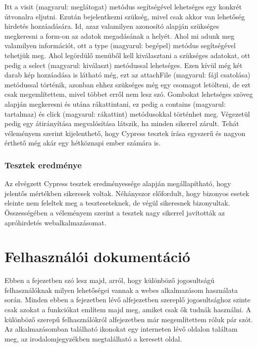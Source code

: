 \documentclass[]{thesis-ekf}
\theoremstyle{definition}
\theoremstyle{remark}
\begin{document}
		
		
		Itt a visit (magyarul: meglátogat) metódus segítségével lehetséges egy konkrét útvonalra eljutni. Ezután bejelentkezni szükség, mivel csak akkor van lehetőség hirdetés hozzáadására. Id, azaz valamilyen azonosító alapján szükséges megkeresni a form-on az adatok megadásának a helyét. Ahol mi adunk meg valamilyen információt, ott a type (magyarul: begépel) metódus segítségével tehetjük meg. Ahol legördülő menüből kell kiválasztani a szükséges adatokat, ott pedig a select (magyarul: kiválaszt) metódussal lehetséges. Ezen kívül még két darab kép hozzáadása is látható még, ezt az attachFile (magyarul: fájl csatolása) metódussal történik, azonban ehhez szükséges még egy csomagot letölteni, de ezt csak megemlítettem, mivel többet erről nem lesz szó. Gombokat lehetséges szöveg alapján megkeresni és utána rákattintani, ez pedig a contains (magyarul: tartalmaz) és click (magyarul: rákattint) metódusokkal történhet meg. Végezetül pedig egy átirányítása megvalósítása látszik, ha minden sikerrel zárult. Tehát véleményem szerint kijelenthető, hogy Cypress tesztek írása egyszerű és nagyon érthető még akár egy hétköznapi ember számára is.
		
	\subsection{Tesztek eredménye}
		Az elvégzett Cypress tesztek eredményessége alapján megállapítható, hogy jelentős mértékben sikeresek voltak. Néhányszor előfordult, hogy bizonyos esetek eleinte nem feleltek meg a teszteseteknek, de végül sikeresnek bizonyultak. Összességében a véleményem szerint a tesztek nagy sikerrel javították az apróhirdetés webalkalmazásomat.   
		
	\chapter{Felhasználói dokumentáció}\label{ch-felhasznaloi}
		Ebben a fejezetben szó lesz majd, arról, hogy különböző jogosultságú felhasználóknak milyen lehetőségei vannak a webes alkalmazásom használata során. Minden ebben a fejezetben lévő alfejezetben szereplő jogosultsághoz szinte csak azokat a funkciókat említem majd meg, amiket csak ők tudnák használni. A különböző szerepű felhasználókról \az{\ref{sc-plantuml}} alfejezetben már megemlítettem róluk pár szót. Az alkalmazásomban található ikonokat egy interneten lévő oldalon találtam meg, az irodalomjegyzékben megtalálható a keresett oldal.\cite{Ikon} 
\end{document}
